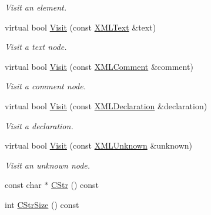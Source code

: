 \begin{DoxyCompactItemize}
\begin{DoxyCompactList}\small\item\em Visit an element. \end{DoxyCompactList}\item 
\hypertarget{classtinyxml2_1_1_x_m_l_printer_a433574d36f484ca0bf29210969033193}{virtual bool \hyperlink{classtinyxml2_1_1_x_m_l_printer_a433574d36f484ca0bf29210969033193}{Visit} (const \hyperlink{classtinyxml2_1_1_x_m_l_text}{X\-M\-L\-Text} \&text)}\label{classtinyxml2_1_1_x_m_l_printer_a433574d36f484ca0bf29210969033193}

\begin{DoxyCompactList}\small\item\em Visit a text node. \end{DoxyCompactList}\item 
\hypertarget{classtinyxml2_1_1_x_m_l_printer_a89e78d273bcd44088e26457b52ff55d6}{virtual bool \hyperlink{classtinyxml2_1_1_x_m_l_printer_a89e78d273bcd44088e26457b52ff55d6}{Visit} (const \hyperlink{classtinyxml2_1_1_x_m_l_comment}{X\-M\-L\-Comment} \&comment)}\label{classtinyxml2_1_1_x_m_l_printer_a89e78d273bcd44088e26457b52ff55d6}

\begin{DoxyCompactList}\small\item\em Visit a comment node. \end{DoxyCompactList}\item 
\hypertarget{classtinyxml2_1_1_x_m_l_printer_af7a3eae73d0a1265252f3c82e0b5b407}{virtual bool \hyperlink{classtinyxml2_1_1_x_m_l_printer_af7a3eae73d0a1265252f3c82e0b5b407}{Visit} (const \hyperlink{classtinyxml2_1_1_x_m_l_declaration}{X\-M\-L\-Declaration} \&declaration)}\label{classtinyxml2_1_1_x_m_l_printer_af7a3eae73d0a1265252f3c82e0b5b407}

\begin{DoxyCompactList}\small\item\em Visit a declaration. \end{DoxyCompactList}\item 
\hypertarget{classtinyxml2_1_1_x_m_l_printer_a99fa7fe3d0aa79c9c20bf2832c7a48fd}{virtual bool \hyperlink{classtinyxml2_1_1_x_m_l_printer_a99fa7fe3d0aa79c9c20bf2832c7a48fd}{Visit} (const \hyperlink{classtinyxml2_1_1_x_m_l_unknown}{X\-M\-L\-Unknown} \&unknown)}\label{classtinyxml2_1_1_x_m_l_printer_a99fa7fe3d0aa79c9c20bf2832c7a48fd}

\begin{DoxyCompactList}\small\item\em Visit an unknown node. \end{DoxyCompactList}\item 
const char $\ast$ \hyperlink{classtinyxml2_1_1_x_m_l_printer_a14bbf3864a7f75200848c42edcce75b3}{C\-Str} () const 
\item 
int \hyperlink{classtinyxml2_1_1_x_m_l_printer_a7c5e961d48b07c83a3b1387e73ad5b86}{C\-Str\-Size} () const 
\end{DoxyCompactItemize}


